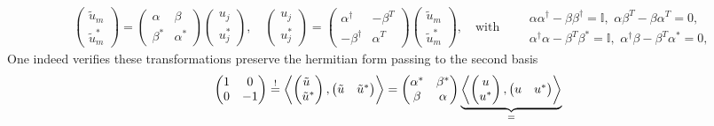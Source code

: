 \documentclass[../QFT_main.tex]{subfiles}
\begin{document}
\begin{mytheorem}
{\begin{align}
    &\begin{pmatrix}\tilde{u}_m\\ \tilde{u}_m^*\end{pmatrix}
    = \begin{pmatrix}\alpha & \beta\\\beta^* & \alpha^* \end{pmatrix}
    \begin{pmatrix}u_j\\ u_j^*\end{pmatrix},\quad
    \begin{pmatrix}u_j\\u_j^*\end{pmatrix}
    = \begin{pmatrix}\alpha^\dagger & -\beta^T\\-\beta^\dagger & \alpha^T \end{pmatrix}
    \begin{pmatrix}\tilde{u}_m\\ \tilde{u}_m^*\end{pmatrix},
    \quad\text{with}\qquad \begin{array}{c} \alpha\alpha^\dagger - \beta \beta^\dagger = \mathbb{I},\,\, \alpha\beta^T - \beta\alpha^T = 0, \\[2.5pt]
    \alpha^\dagger \alpha - \beta^T \beta^* = \mathbb{I},\,\, \alpha^\dagger \beta - \beta^T \alpha^* = 0,
    \end{array}
\end{align}}
One indeed verifies these transformations preserve the hermitian form passing to the second basis
{\small\begin{align}
\begin{pmatrix} 1 & 0\\0 & -1\end{pmatrix} \overset{!}{=}
\left\langle \begin{pmatrix} \tilde{u}\,\,\\\tilde{u}^*\end{pmatrix}, \begin{pmatrix} \tilde{u}& \tilde{u}^*\end{pmatrix}\right\rangle 
= \begin{pmatrix}\alpha^* & \beta^*\\\beta & \alpha \end{pmatrix}
\underbrace{\left\langle \begin{pmatrix} u\\ u^*\end{pmatrix}, \begin{pmatrix} u & u^*\end{pmatrix}\right\rangle}_{\tiny =
}
\end{align}}
\end{mytheorem}
\end{document}
